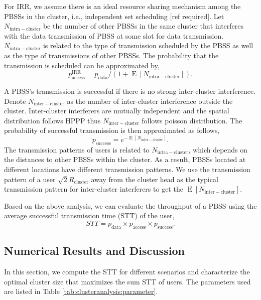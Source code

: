 \documentclass[10pt, conference, letterpaper]{IEEEtran}
\DeclareMathOperator*{\E}{\mathrm{E}}
\begin{document}
For IRR, we assume there is an ideal resource sharing mechanism among the PBSSs in the cluster, i.e., independent set scheduling [ref required]. Let $N_{\mathrm{intra-cluster}}$ be the number of other PBSSs in the same cluster that interferes with the data transmission of PBSS at some slot for data transmission. $N_{\mathrm{intra-cluster}}$ is related to the type of transmission scheduled by the PBSS as well as the type of transmissions of other PBSSs. The probability that the transmission is scheduled can be approximated by, 
\begin{equation*}
p_{\mathrm{access}}^{\mathrm{IRR}} = p_{\mathrm{data}}/(1+\E[N_{\mathrm{intra-cluster}}]).
\end{equation*} 

A PBSS's transmission is successful if there is no strong inter-cluster interference. Denote $N_{\mathrm{inter-cluster}}$ as the number of inter-cluster interference outside the cluster. Inter-cluster interferers are mutually independent and the spatial distribution follows HPPP thus $N_{\mathrm{inter-cluster}}$ follows poisson distribution. The probability of successful transmission is then approximated as follows, 
\begin{equation*}
p_{\mathrm{success}} = e^{-\E[N_{\mathrm{inter-cluster}}]}.
\end{equation*} 
The transmission patterns of users is related to $N_{\mathrm{intra-cluster}}$, which depends on the distances to other PBSSs within the cluster. As a result, PBSSs located at different locations have different transmission patterns. We use the transmission pattern of a user $\sqrt{2}R_{\mathrm{cluster}}$ away from the cluster head as the typical transmission pattern for inter-cluster interferers to get the $\E[N_{\mathrm{inter-cluster}}]$.

Based on the above analysis, we can evaluate the throughput of a PBSS using the average successful transmission time (STT) of the user,
\begin{equation*}
STT = p_{\mathrm{data}}\times p_{\mathrm{access}} \times p_{\mathrm{success}}.
\end{equation*}

\subsection{Numerical Results and Discussion}
In this section, we compute the STT for different scenarios and characterize the optimal cluster size that maximizes the sum STT of users. 
The parameters used are listed in Table \ref{tab:clusteranalysis:parameter}.
\end{document}

